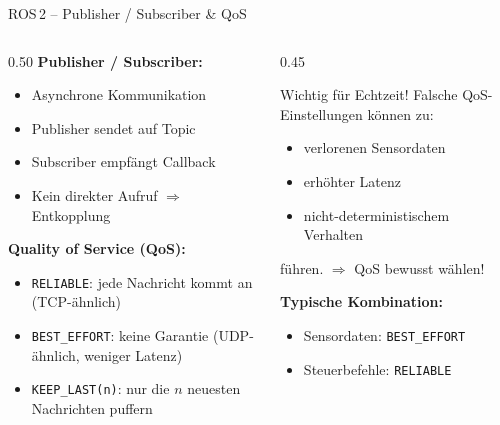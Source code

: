 \documentclass[%
  aspectratio=169,
  10pt
]{beamer}
\begin{document}
\begin{frame}{ROS\,2 -- Publisher / Subscriber \& QoS}

\begin{columns}[T]
  \begin{column}{0.50\textwidth}
    \textbf{Publisher / Subscriber:}
    \begin{itemize}
      \item Asynchrone Kommunikation
      \item Publisher sendet auf Topic
      \item Subscriber empfängt Callback
      \item Kein direkter Aufruf $\Rightarrow$ Entkopplung
    \end{itemize}

    \vspace{2mm}
    \textbf{Quality of Service (QoS):}
    \begin{itemize}
      \item \texttt{RELIABLE}: jede Nachricht kommt an
            (TCP-ähnlich)
      \item \texttt{BEST\_EFFORT}: keine Garantie
            (UDP-ähnlich, weniger Latenz)
      \item \texttt{KEEP\_LAST(n)}: nur die $n$ neuesten
            Nachrichten puffern
    \end{itemize}
  \end{column}
  \begin{column}{0.45\textwidth}
    \begin{alertblock}{Wichtig für Echtzeit!}
      Falsche QoS-Einstellungen können zu:
      \begin{itemize}
        \item verlorenen Sensordaten
        \item erhöhter Latenz
        \item nicht-deterministischem Verhalten
      \end{itemize}
      führen. $\Rightarrow$ QoS bewusst wählen!
    \end{alertblock}

    \vspace{2mm}
    \textbf{Typische Kombination:}
    \begin{itemize}
      \item Sensordaten: \texttt{BEST\_EFFORT}
      \item Steuerbefehle: \texttt{RELIABLE}
    \end{itemize}
  \end{column}
\end{columns}

\end{frame}
\end{document}
